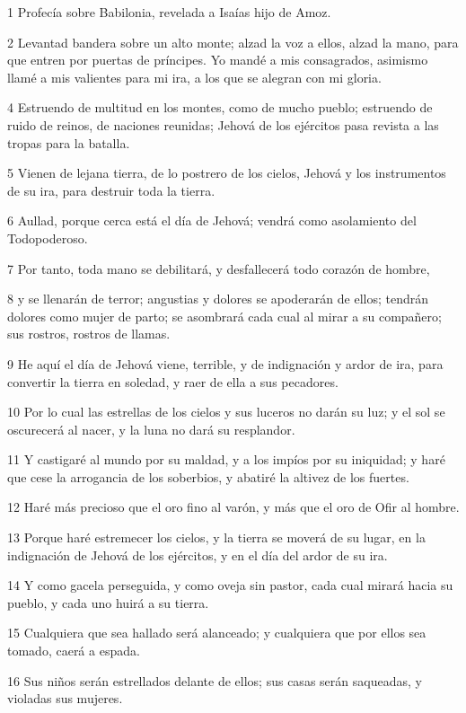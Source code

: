 \par 1 Profecía sobre Babilonia, revelada a Isaías hijo de Amoz.
\par 2 Levantad bandera sobre un alto monte; alzad la voz a ellos, alzad la mano, para que entren por puertas de príncipes. Yo mandé a mis consagrados, asimismo llamé a mis valientes para mi ira, a los que se alegran con mi gloria.
\par 4 Estruendo de multitud en los montes, como de mucho pueblo; estruendo de ruido de reinos, de naciones reunidas; Jehová de los ejércitos pasa revista a las tropas para la batalla.
\par 5 Vienen de lejana tierra, de lo postrero de los cielos, Jehová y los instrumentos de su ira, para destruir toda la tierra.
\par 6 Aullad, porque cerca está el día de Jehová; vendrá como asolamiento del Todopoderoso. 
\par 7 Por tanto, toda mano se debilitará, y desfallecerá todo corazón de hombre,
\par 8 y se llenarán de terror; angustias y dolores se apoderarán de ellos; tendrán dolores como mujer de parto; se asombrará cada cual al mirar a su compañero; sus rostros, rostros de llamas.
\par 9 He aquí el día de Jehová viene, terrible, y de indignación y ardor de ira, para convertir la tierra en soledad, y raer de ella a sus pecadores.
\par 10 Por lo cual las estrellas de los cielos y sus luceros no darán su luz; y el sol se oscurecerá al nacer, y la luna no dará su resplandor. 
\par 11 Y castigaré al mundo por su maldad, y a los impíos por su iniquidad; y haré que cese la arrogancia de los soberbios, y abatiré la altivez de los fuertes.
\par 12 Haré más precioso que el oro fino al varón, y más que el oro de Ofir al hombre.
\par 13 Porque haré estremecer los cielos, y la tierra se moverá de su lugar, en la indignación de Jehová de los ejércitos, y en el día del ardor de su ira.
\par 14 Y como gacela perseguida, y como oveja sin pastor, cada cual mirará hacia su pueblo, y cada uno huirá a su tierra.
\par 15 Cualquiera que sea hallado será alanceado; y cualquiera que por ellos sea tomado, caerá a espada.
\par 16 Sus niños serán estrellados delante de ellos; sus casas serán saqueadas, y violadas sus mujeres.
